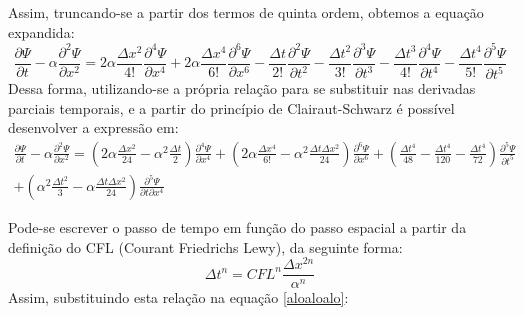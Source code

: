\documentclass[10pt,twoside,a4paper]{article}
\begin{document}
Assim, truncando-se a partir dos termos de quinta ordem, obtemos a equação expandida:
\begin{equation}
\frac{\partial \Psi}{\partial t} - \alpha \frac{\partial^2 \Psi}{\partial x^2} = 2 \alpha \frac{\Delta x^2}{4!} \frac{\partial^4 \Psi}{\partial x ^4}
+ 2 \alpha \frac{\Delta x^4}{6!} \frac{\partial^6 \Psi}{\partial x ^6} - \frac{\Delta t}{2!} \frac{\partial^2 \Psi}{\partial t ^2} - \frac{\Delta t ^2}{3!} \frac{\partial^3 \Psi}{\partial t ^3} - \frac{\Delta t ^3}{4!} \frac{\partial^4 \Psi}{\partial t ^4} - \frac{\Delta t ^4}{5!} \frac{\partial^5 \Psi}{\partial t ^5}
\end{equation}
Dessa forma, utilizando-se a própria relação para se substituir nas derivadas parciais temporais, e a partir do princípio de Clairaut-Schwarz é possível desenvolver a expressão em:
\begin{equation}\label{aloaloalo}
\begin{split}
\frac{\partial \Psi}{\partial t} - \alpha \frac{\partial^2 \Psi}{\partial x^2} = \left(2\alpha \frac{\Delta x^2}{24}-\alpha ^2 \frac{\Delta t}{2}\right)
\frac{\partial ^4 \Psi}{\partial x ^4} + \left(2\alpha \frac{\Delta x^4}{6!}-\alpha ^2 \frac{\Delta t \Delta x^2}{24}\right)\frac{\partial ^6 \Psi}{\partial x ^6}
+ \left( \frac{\Delta t^4}{48} -\frac{\Delta t^4}{120} - \frac{\Delta t^4}{72} \right)\frac{\partial^5 \Psi}{\partial t^5} \\
+ \left(\alpha^2 \frac{\Delta t^2}{3}-\alpha \frac{\Delta t \Delta x^2}{24}\right)\frac{\partial ^5 \Psi}{\partial t \partial x ^4}
\end{split}
\end{equation}

 

Pode-se escrever o passo de tempo em função do passo espacial a partir da definição do CFL (Courant Friedrichs Lewy), da seguinte forma:
\begin{equation} \label{CFL}
\Delta t^n= CFL^n \frac{\Delta x^{2n}}{\alpha^{n}}
\end{equation}
Assim, substituindo esta relação na equação \ref{aloaloalo}:
\end{document}
